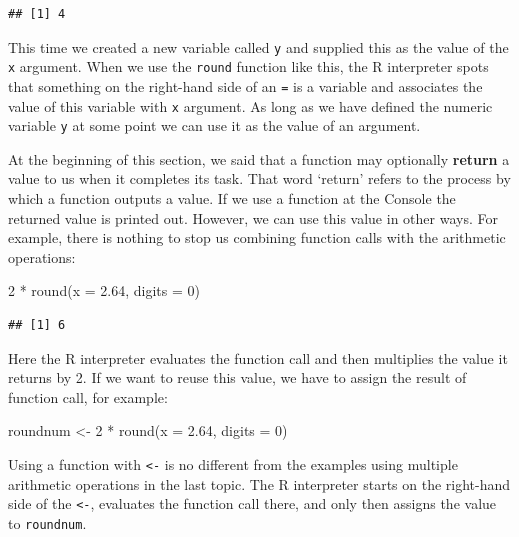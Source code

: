 \documentclass[
]{book}
\newenvironment{Shaded}{\begin{snugshade}}{\end{snugshade}}
\newcommand{\AttributeTok}[1]{\textcolor[rgb]{0.77,0.63,0.00}{#1}}
\newcommand{\DecValTok}[1]{\textcolor[rgb]{0.00,0.00,0.81}{#1}}
\newcommand{\FloatTok}[1]{\textcolor[rgb]{0.00,0.00,0.81}{#1}}
\newcommand{\FunctionTok}[1]{\textcolor[rgb]{0.00,0.00,0.00}{#1}}
\newcommand{\NormalTok}[1]{#1}
\newcommand{\OtherTok}[1]{\textcolor[rgb]{0.56,0.35,0.01}{#1}}
\newcommand{\SpecialCharTok}[1]{\textcolor[rgb]{0.00,0.00,0.00}{#1}}
\begin{document}
\begin{verbatim}
## [1] 4
\end{verbatim}

This time we created a new variable called \texttt{y} and supplied this as the value of the \texttt{x} argument. When we use the \texttt{round} function like this, the R interpreter spots that something on the right-hand side of an \texttt{=} is a variable and associates the value of this variable with \texttt{x} argument. As long as we have defined the numeric variable \texttt{y} at some point we can use it as the value of an argument.

At the beginning of this section, we said that a function may optionally \textbf{return} a value to us when it completes its task. That word `return' refers to the process by which a function outputs a value. If we use a function at the Console the returned value is printed out. However, we can use this value in other ways. For example, there is nothing to stop us combining function calls with the arithmetic operations:

\begin{Shaded}
\begin{Highlighting}[]
\DecValTok{2} \SpecialCharTok{*} \FunctionTok{round}\NormalTok{(}\AttributeTok{x =} \FloatTok{2.64}\NormalTok{, }\AttributeTok{digits =} \DecValTok{0}\NormalTok{)}
\end{Highlighting}
\end{Shaded}

\begin{verbatim}
## [1] 6
\end{verbatim}

Here the R interpreter evaluates the function call and then multiplies the value it returns by 2. If we want to reuse this value, we have to assign the result of function call, for example:

\begin{Shaded}
\begin{Highlighting}[]
\NormalTok{roundnum }\OtherTok{\textless{}{-}} \DecValTok{2} \SpecialCharTok{*} \FunctionTok{round}\NormalTok{(}\AttributeTok{x =} \FloatTok{2.64}\NormalTok{, }\AttributeTok{digits =} \DecValTok{0}\NormalTok{)}
\end{Highlighting}
\end{Shaded}

Using a function with \texttt{\textless{}-} is no different from the examples using multiple arithmetic operations in the last topic. The R interpreter starts on the right-hand side of the \texttt{\textless{}-}, evaluates the function call there, and only then assigns the value to \texttt{roundnum}.
\end{document}
